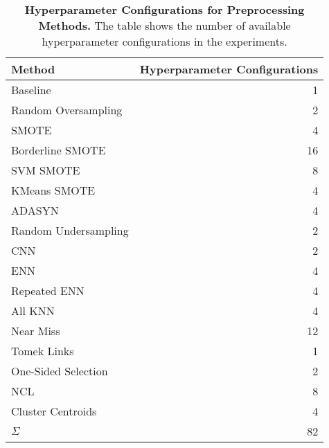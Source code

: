 \begin{table}
    \centering

    \begin{tabular}{lr}
        \toprule
        Method & Hyperparameter Configurations \\
        \midrule
        Baseline & 1 \\
        Random Oversampling & 2 \\
        SMOTE & 4 \\
        Borderline SMOTE & 16 \\
        SVM SMOTE & 8 \\
        KMeans SMOTE & 4 \\
        ADASYN & 4 \\
        Random Undersampling & 2 \\
        CNN & 2 \\
        ENN & 4 \\
        Repeated ENN & 4 \\
        All KNN & 4 \\
        Near Miss & 12 \\
        Tomek Links & 1 \\
        One-Sided Selection & 2 \\
        NCL & 8 \\
        Cluster Centroids & 4 \\
        \midrule
        $\Sigma$ & 82 \\
        \bottomrule
    \end{tabular}

    \caption{
        \textbf{Hyperparameter Configurations for Preprocessing Methods.} The table shows the
        number of available hyperparameter configurations in the experiments.
    }
    \label{table:configs}
\end{table}

